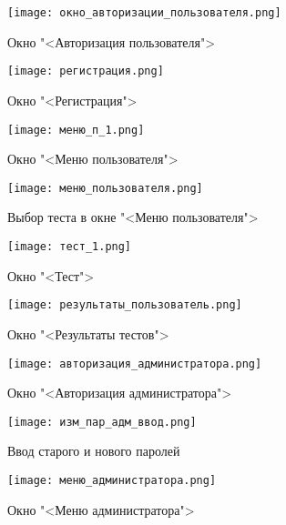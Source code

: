 \begin{figure}[H]
	\centering
	\texttt{[image: окно\_авторизации\_пользователя.png]}
	\caption{Окно "<Авторизация пользователя">}
	\label{user_auth_window_1:image}
\end{figure}
\begin{figure}[H]
	\centering
	\texttt{[image: регистрация.png]}
	\caption{Окно "<Регистрация">}
	\label{reg_window_1:image}
\end{figure}
\begin{figure}[H]
	\centering
	\texttt{[image: меню\_п\_1.png]}
	\caption{Окно "<Меню пользователя">}
	\label{user_menu_2:image}
\end{figure}
\begin{figure}[H]
	\centering
	\texttt{[image: меню\_пользователя.png]}
	\caption{Выбор теста в окне "<Меню пользователя">}
	\label{user_menu_window_1:image}
\end{figure}
\begin{figure}[H]
	\centering
	\texttt{[image: тест\_1.png]}
	\caption{Окно "<Тест">}
	\label{test_window_1:image}
\end{figure}
\begin{figure}[H]
	\centering
	\texttt{[image: результаты\_пользователь.png]}
	\caption{Окно "<Результаты тестов">}
	\label{user_results_1:image}
\end{figure}
\begin{figure}[H]
	\centering
	\texttt{[image: авторизация\_администратора.png]}
	\caption{Окно "<Авторизация администратора">}
	\label{admin_auth_window_1:image}
\end{figure}
\begin{figure}[H]
	\centering
	\texttt{[image: изм\_пар\_адм\_ввод.png]}
	\caption{Ввод старого и нового паролей}
	\label{admin_password_input_1:image}
\end{figure}
\begin{figure}[H]
	\centering
	\texttt{[image: меню\_администратора.png]}
	\caption{Окно "<Меню администратора">}
	\label{admin_menu_2:image}
\end{figure}


